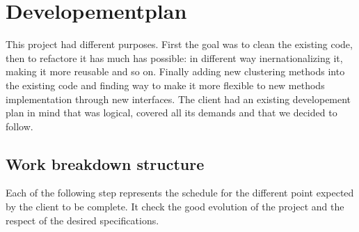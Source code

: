 \section{Developementplan}
This project had different purposes. First the goal was to clean the existing code, then to refactore it has much has possible: in different way inernationalizing it, making it more reusable and so on. Finally adding new clustering methods into the existing code and finding way to make it more flexible to new methods implementation through new interfaces.
The client had an existing developement plan in mind that was logical, covered all its demands and that we decided to follow.


\subsection{Work breakdown structure}
Each of the following step represents the schedule for the different point expected by the client to be complete. It check the good evolution of the project and the respect of the desired specifications.
